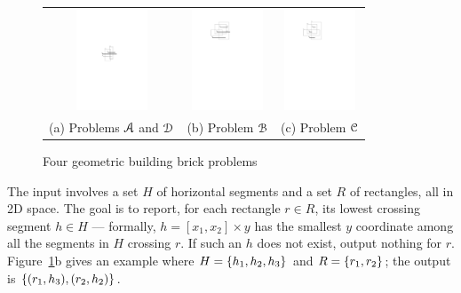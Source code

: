 \documentclass[sigconf]{acmart}
\def\extraspacing{\vspace{2mm} \noindent}
\def\figcapup{\vspace{-0mm}}
\def\figcapdown{\vspace{-0mm}}
\begin{document}
\begin{figure}
    \begin{tabular}{ccc}
        \includegraphics[height=30mm]{./artwork/prob-a} & 
        \hspace{3mm}
        \includegraphics[height=30mm]{./artwork/prob-b} &
        \hspace{3mm}
        \includegraphics[height=30mm]{./artwork/prob-c} \\
        (a) Problems $\EuScript{A}$ and $\EuScript{D}$ &
        \hspace{3mm}
        (b) Problem $\EuScript{B}$ &
        \hspace{3mm}
        (c) Problem $\EuScript{C}$
    \end{tabular}

    \figcapup
    \caption{Four geometric building brick problems}
    \label{fig:probs}
    \figcapdown
\end{figure}


\extraspacing {\bf Problem $\bm{\EuScript{A}}$.} The input involves a set $H$ of horizontal segments and a set $R$ of rectangles, all in 2D space. The goal is to report, for each rectangle $r \in R$, its lowest crossing segment $h \in H$ --- formally, $h = [x_1, x_2] \times y$ has the smallest $y$ coordinate among all the segments in $H$ crossing $r$. If such an $h$ does not exist, output nothing for $r$.  Figure~\ref{fig:probs}b gives an example where $H = \{h_1, h_2, h_3\}$ and $R = \{r_1, r_2\}$; the output is $\{(r_1, h_3), (r_2, h_2)\}$.
\end{document}
